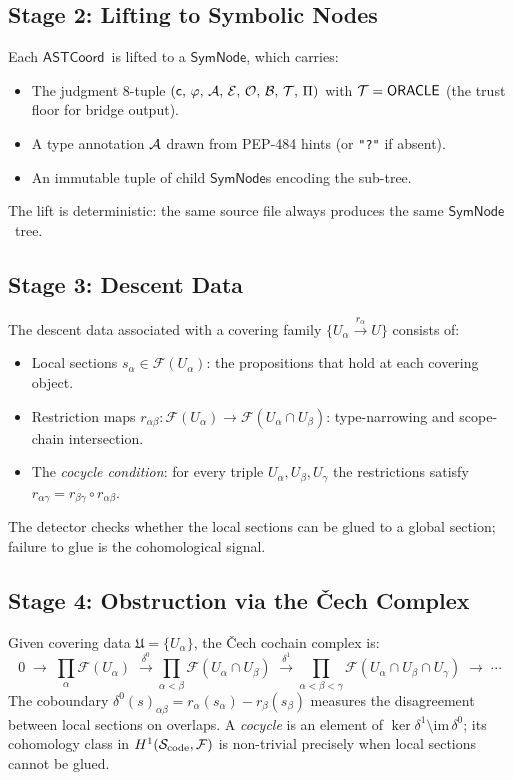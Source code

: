 \documentclass[11pt]{article}
\newcommand{\SemSite}{\mathcal{S}_{\mathrm{code}}}%
\newcommand{\ASTCoord}{\ensuremath{\mathsf{ASTCoord}}}         %
\newcommand{\SymNode}{\ensuremath{\mathsf{SymNode}}}           %
\begin{document}
\subsection{Stage 2: Lifting to Symbolic Nodes}

Each \ASTCoord\ is lifted to a \SymNode, which carries:
\begin{itemize}[leftmargin=2em,topsep=2pt]
  \item The judgment 8-tuple
    $(\mathsf{c},\,\varphi,\,\mathcal{A},\,\mathcal{E},\,\mathcal{O},\,\mathcal{B},\,\mathcal{T},\,\Pi)$
    with $\mathcal{T} = \mathsf{ORACLE}$ (the trust floor for bridge output).
  \item A type annotation $\mathcal{A}$ drawn from PEP-484 hints (or
    \texttt{"?"} if absent).
  \item An immutable tuple of child \SymNode{}s encoding the sub-tree.
\end{itemize}
The lift is deterministic: the same source file always produces the same
\SymNode\ tree.

\subsection{Stage 3: Descent Data}

The descent data associated with a covering family
$\{U_\alpha \xrightarrow{r_\alpha} U\}$ consists of:
\begin{itemize}[leftmargin=2em,topsep=2pt]
  \item Local sections $s_\alpha \in \mathcal{F}(U_\alpha)$: the
    propositions that hold at each covering object.
  \item Restriction maps $r_{\alpha\beta} : \mathcal{F}(U_\alpha) \to
    \mathcal{F}(U_\alpha \cap U_\beta)$: type-narrowing and scope-chain
    intersection.
  \item The \emph{cocycle condition}: for every triple
    $U_\alpha, U_\beta, U_\gamma$ the restrictions satisfy
    $r_{\alpha\gamma} = r_{\beta\gamma} \circ r_{\alpha\beta}$.
\end{itemize}
The detector checks whether the local sections can be glued to a global
section; failure to glue is the cohomological signal.

\subsection{Stage 4: Obstruction via the \v{C}ech Complex}

Given covering data $\mathfrak{U} = \{U_\alpha\}$, the \v{C}ech cochain
complex is:
\[
  0 \;\longrightarrow\;
  \prod_\alpha \mathcal{F}(U_\alpha)
  \;\xrightarrow{\;\delta^0\;}
  \prod_{\alpha < \beta} \mathcal{F}(U_\alpha \cap U_\beta)
  \;\xrightarrow{\;\delta^1\;}
  \prod_{\alpha<\beta<\gamma} \mathcal{F}(U_\alpha\cap U_\beta \cap U_\gamma)
  \;\longrightarrow\;\cdots
\]
The coboundary $\delta^0(s)_{\alpha\beta} = r_\alpha(s_\alpha) -
r_\beta(s_\beta)$ measures the disagreement between local sections on
overlaps.  A \emph{cocycle} is an element of
$\ker\delta^1 \setminus \mathrm{im}\,\delta^0$; its cohomology class in
$\Hcoh{1}(\SemSite,\mathcal{F})$ is non-trivial precisely when local
sections cannot be glued.
\end{document}
